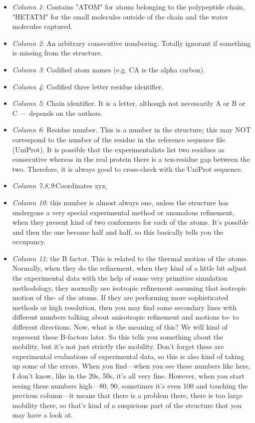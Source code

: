\begin{itemize}
    \item \textit{Column 1}: Contains "ATOM" for atoms belonging to the polypeptide chain, "HETATM" for the small molecules outside of the chain and the water molecules captured.
    \item \textit{Column 2}: An arbitrary  consecutive numbering. Totally ignorant if something is missing from the structure.
    \item \textit{Column 3}: Codified atom names (e.g. CA is the alpha carbon).
    \item \textit{Column 4}: Codified three letter residue identifier.
    \item \textit{Column 5}: Chain identifier. It is a letter, although not necessarily A or B or C —  depends on the authors.
    \item \textit{Column 6}: Residue number. This is a number in the structure; this may NOT correspond to the number of the residue in the reference sequence file (UniProt). It is possible that the experimentalists list two residues as consecutive whereas  in the real protein there is a ten-residue gap between the two. Therefore, it is always good to cross-check with the UniProt sequence.
    \item \textit{Column 7,8,9}:Coordinates xyz,
    \item \textit{Column 10}: this number is almost always one, unless the structure has undergone a very special experimental method or anomalous refinement, when they present kind of two conformers for each of the atoms. It's possible and then the one become half and half, so this basically tells you the occupancy.
    \item \textit{Column 11}: the B factor. This is related to the thermal motion of the atoms. Normally, when they do the refinement, when they kind of a little bit adjust the experimental data with the help of some very primitive simulation methodology, they normally use isotropic refinement assuming that isotropic motion of the- of the atoms. If they are performing more sophisticated methods or high resolution, then you may find some secondary lines with different numbers talking about anisotropic refinement and motions to- to different directions. Now, what is the meaning of this? We will kind of represent these B-factors later. So this tells you something about the mobility, but it's not just strictly the mobility. Don't forget these are experimental evaluations of experimental data, so this is also kind of taking up some of the errors. When you find—when you see these numbers like here, I don't know, like in the 20s, 50s, it's all very fine. However, when you start seeing these numbers high—80, 90, sometimes it's even 100 and touching the previous column—it means that there is a problem there, there is too large mobility there, so that's kind of a suspicious part of the structure that you may have a look at.
\end{itemize}

